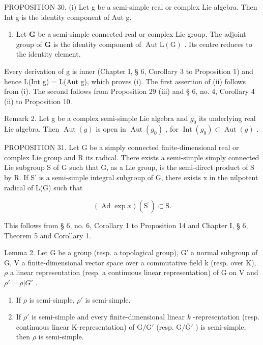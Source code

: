 PROPOSITION 30. (i) Let g be a semi-simple real or complex Lie algebra. Then Int g is the identity component of Aut g.

\begin{enumerate}
\def\labelenumi{(\roman{enumi})}
\setcounter{enumi}{1}
\tightlist
\item
  Let \(\mathbf{G}\) be a semi-simple connected real or complex Lie group. The adjoint group of \(\mathbf{G}\) is the identity component of \(\operatorname{Aut} \mathrm{L}(\mathrm{G})\) . Its centre reduces to the identity element.
\end{enumerate}

Every derivation of g is inner (Chapter I, § 6, Corollary 3 to Proposition 1) and hence L(Int g) = L(Aut g), which proves (i). The first assertion of (ii) follows from (i). The second follows from Proposition 29 (iii) and § 6, no. 4, Corollary 4 (ii) to Proposition 10.

Remark 2. Let g be a complex semi-simple Lie algebra and \(g_{0}\) its underlying real Lie algebra. Then \(\operatorname{Aut}(g)\) is open in \(\operatorname{Aut}(g_{0})\) , for \(\operatorname{Int}(g_{0}) \subset \operatorname{Aut}(g)\) .

PROPOSITION 31. Let G be a simply connected finite-dimensional real or complex Lie group and R its radical. There exists a semi-simple simply connected Lie subgroup S of G such that G, as a Lie group, is the semi-direct product of S by R. If S' is a semi-simple integral subgroup of G, there exists x in the nilpotent radical of L(G) such that

\[
(\operatorname{Ad} \exp x) (\mathrm{S} ^ {\prime}) \subset \mathrm{S}.
\]

This follows from § 6, no. 6, Corollary 1 to Proposition 14 and Chapter I, § 6, Theorem 5 and Corollary 1.

Lemma 2. Let G be a group (resp. a topological group), G' a normal subgroup of G, V a finite-dimensional vector space over a commutative field k (resp. over K), \(\rho\) a linear representation (resp. a continuous linear representation) of G on V and \(\rho' = \rho|G'\) .

\begin{enumerate}
\def\labelenumi{(\roman{enumi})}
\item
  If \(\rho\) is semi-simple, \(\rho'\) is semi-simple.
\item
  If \(\rho'\) is semi-simple and every finite-dimensional linear \(k\) -representation (resp. continuous linear K-representation) of \(\mathrm{G} / \mathrm{G}'\) (resp. \(\mathrm{G} / \overline{\mathrm{G}}'\) ) is semi-simple, then \(\rho\) is semi-simple.
\end{enumerate}

